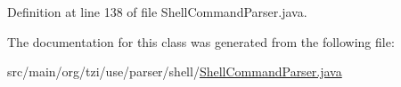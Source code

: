 Definition at line 138 of file Shell\-Command\-Parser.\-java.



The documentation for this class was generated from the following file\-:\begin{DoxyCompactItemize}
\item 
src/main/org/tzi/use/parser/shell/\hyperlink{_shell_command_parser_8java}{Shell\-Command\-Parser.\-java}\end{DoxyCompactItemize}
